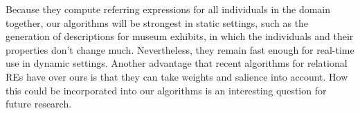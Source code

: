 Because they compute referring expressions for all individuals in the
domain together, our algorithms will be strongest in static settings,
such as the generation of descriptions for museum exhibits, in which
the individuals and their properties don't change much.  Nevertheless,
they remain fast enough for real-time use in dynamic settings.
Another advantage that recent algorithms for relational REs
\cite{Krahmer2003,kelleher06:_increm_gener_of_spatial_refer} have over
ours is that they can take weights and salience into account.  How
this could be incorporated into our algorithms is an interesting
question for future research.


